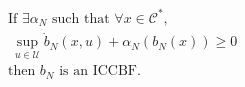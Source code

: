 \documentclass[preview]{standalone}
\begin{document}
\begin{align*}
&\text{If } \exists \alpha_N \text{ such  that }\forall x \in \mathcal{C}^*,\\ &\ \sup_{u \in \mathcal{U}} \dot b_N(x, u) + \alpha_N(b_N(x)) \geq 0\\ &\text{then } b_N \text{ is an ICCBF.}
\end{align*}
\end{document}
